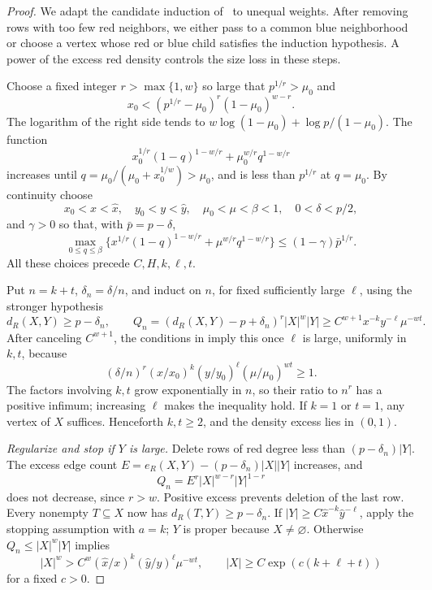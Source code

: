 \documentclass[11pt]{article}
\theoremstyle{definition}
\begin{document}
\begin{proof}
We adapt the candidate induction of~\cite[Lemma~12]{GNNW} to unequal weights. After removing rows with too few red neighbors, we either pass to a common blue neighborhood or choose a vertex whose red or blue child satisfies the induction hypothesis. A power of the excess red density controls the size loss in these steps.

Choose a fixed integer \(r>\max\{1,w\}\) so large that \(p^{1/r}>\mu_0\) and
\[
 x_0<(p^{1/r}-\mu_0)^r(1-\mu_0)^{w-r}.
\]
The logarithm of the right side tends to \(w\log(1-\mu_0)+\log p/(1-\mu_0)\). The function
\[
 x_0^{1/r}(1-q)^{1-w/r}+\mu_0^{w/r}q^{1-w/r}
\]
increases until \(q=\mu_0/(\mu_0+x_0^{1/w})>\mu_0\), and is less than \(p^{1/r}\) at \(q=\mu_0\). By continuity choose
\[
 x_0<x<\widehat x,\quad y_0<y<\widehat y,\quad
 \mu_0<\mu<\beta<1,\quad0<\delta<p/2,
\]
and \(\gamma>0\) so that, with \(\bar p=p-\delta\),
\begin{equation}\label{eq:scalar}
 \max_{0\le q\le\beta}
 \{x^{1/r}(1-q)^{1-w/r}+\mu^{w/r}q^{1-w/r}\}
 \le(1-\gamma)\bar p^{1/r}.
\end{equation}
All these choices precede \(C,H,k,\ell,t\).

Put \(n=k+t\), \(\delta_n=\delta/n\), and induct on \(n\), for fixed sufficiently large \(\ell\), using the stronger hypothesis
\begin{equation}\label{eq:moment}
 d_R(X,Y)\ge p-\delta_n,\qquad
 Q_n=(d_R(X,Y)-p+\delta_n)^r|X|^w|Y|
 \ge C^{w+1}x^{-k}y^{-\ell}\mu^{-wt}.
\end{equation}
After canceling \(C^{w+1}\), the conditions in  imply this once \(\ell\) is large, uniformly in \(k,t\), because
\[
 (\delta/n)^r(x/x_0)^k(y/y_0)^\ell(\mu/\mu_0)^{wt}\ge1.
\]
The factors involving \(k,t\) grow exponentially in \(n\), so their ratio to \(n^r\) has a positive infimum; increasing \(\ell\) makes the inequality hold. If \(k=1\) or \(t=1\), any vertex of \(X\) suffices. Henceforth \(k,t\ge2\), and the density excess lies in \((0,1)\).

\emph{Regularize and stop if \(Y\) is large.}
Delete rows of red degree less than \((p-\delta_n)|Y|\). The excess edge count \(E=e_R(X,Y)-(p-\delta_n)|X||Y|\) increases, and
\[
 Q_n=E^r|X|^{w-r}|Y|^{1-r}
\]
does not decrease, since \(r>w\). Positive excess prevents deletion of the last row. Every nonempty \(T\subseteq X\) now has \(d_R(T,Y)\ge p-\delta_n\).
If \(|Y|\ge C\widehat x^{-k}\widehat y^{-\ell}\), apply the stopping assumption with \(a=k\); \(Y\) is proper because \(X\ne\varnothing\). Otherwise \(Q_n\le|X|^w|Y|\) implies
\begin{equation}\label{eq:largeX}
 |X|^w>C^w(\widehat x/x)^k(\widehat y/y)^\ell\mu^{-wt},
 \qquad |X|\ge C\exp(c(k+\ell+t))
\end{equation}
for a fixed \(c>0\).


\end{proof}
\end{document}
